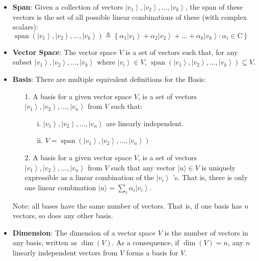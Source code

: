 \documentclass[main.tex]{subfiles}
\begin{document}
\begin{enumerate}
\begin{enumerate}
        \begin{itemize}
            \item \textbf{Span}: Given a collection of vectors $\left|v_{1}\right\rangle,\left|v_{2}\right\rangle, \ldots,\left|v_{k}\right\rangle$, the span of these vectors is the set of all possible linear combinations of these (with complex scalars): $\operatorname{span}\left(\left|v_{1}\right\rangle,\left|v_{2}\right\rangle, \ldots,\left|v_{k}\right\rangle\right) \triangleq\left\{\alpha_{1}\left|v_{1}\right\rangle+\alpha_{2}\left|v_{2}\right\rangle+\ldots+\alpha_{k}\left|v_{k}\right\rangle: \alpha_{i} \in \mathrm{C}\right\}$
            \item \textbf{Vector Space}: The vector space $V$ is a set of vectors such that, for any subset $\left|v_{1}\right\rangle,\left|v_{2}\right\rangle, \ldots,\left|v_{k}\right\rangle$ where $\left|v_{i}\right\rangle \in V$, $\operatorname{span}\left(\left|v_{1}\right\rangle,\left|v_{2}\right\rangle, \ldots,\left|v_{k}\right\rangle\right) \subseteq V$.
            \item \textbf{Basis}: There are multiple equivalent definitions for the Basis:
            \begin{enumerate}
                \item [1.] A basis for a given vector space $V$, is a set of vectors $\left|v_{1}\right\rangle,\left|v_{2}\right\rangle, \ldots,\left|v_{n}\right\rangle$ from $V$ such that:
                \begin{enumerate}
                    \item [i.] $\left|v_{1}\right\rangle,\left|v_{2}\right\rangle, \ldots,\left|v_{n}\right\rangle$ are linearly independent.
                    \item [ii.] $V=\operatorname{span}\left(\left|v_{1}\right\rangle,\left|v_{2}\right\rangle, \ldots,\left|v_{n}\right\rangle\right)$ 
                \end{enumerate}
                \item [2.] A basis for a given vector space $V$, is a set of vectors $\left|v_{1}\right\rangle,\left|v_{2}\right\rangle, \ldots,\left|v_{n}\right\rangle$ from $V$ such that any vector $|u\rangle \in V$ is uniquely expressible as a linear combination of the $\left|v_{i}\right\rangle$ 's. That is, there is only one linear combination $|u\rangle=\sum_{i} \alpha_{i}\left|v_{i}\right\rangle$.
            \end{enumerate}
            Note: all bases have the same number of vectors. That is, if one basis has $n$ vectors, so does any other basis.
            \item \textbf{Dimension}: The dimension of a vector space $V$ is the number of vectors in any basis, written as $\operatorname{dim}(V)$. As a consequence, if $\operatorname{dim}(V)=n$, any $n$ linearly independent vectors from $V$ forms a basis for $V$.
        \end{itemize}
        

\end{enumerate}
\end{enumerate}
\end{document}
